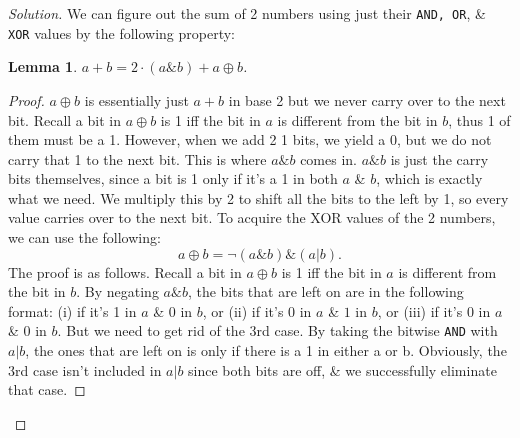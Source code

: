 \documentclass{article}
\newtheorem{lemma}{Lemma}
\begin{document}
\begin{proof}[Solution]
    We can figure out the sum of 2 numbers using just their {\tt AND, OR}, \& {\tt XOR} values by the following property:

    \begin{lemma}
        $a + b = 2\cdot(a\&b) + a\oplus b$.
    \end{lemma}

    \begin{proof}[Proof]
        $a\oplus b$ is essentially just $a + b$ in base 2 but we never carry over to the next bit. Recall a bit in $a\oplus b$ is 1 iff the bit in $a$ is different from the bit in $b$, thus 1 of them must be a 1. However, when we add 2 1 bits, we yield a 0, but we do not carry that 1 to the next bit. This is where $a\&b$ comes in. $a\&b$ is just the carry bits themselves, since a bit is 1 only if it's a 1 in both $a$ \& $b$, which is exactly what we need. We multiply this by 2 to shift all the bits to the left by 1, so every value carries over to the next bit. To acquire the XOR values of the 2 numbers, we can use the following:
        \begin{equation*}
            a\oplus b = \neg(a\&b)\&(a|b).
        \end{equation*}
        The proof is as follows. Recall a bit in $a\oplus b$ is 1 iff the bit in $a$ is different from the bit in $b$. By negating $a\&b$, the bits that are left on are in the following format: (i) if it's 1 in $a$ \& 0 in $b$, or (ii) if it's 0 in $a$ \& $1$ in $b$, or (iii) if it's 0 in $a$ \& 0 in $b$. But we need to get rid of the 3rd case. By taking the bitwise {\tt AND} with $a|b$, the ones that are left on is only if there is a 1 in either a or b. Obviously, the 3rd case isn't included in $a|b$ since both bits are off, \& we successfully eliminate that case.


\end{proof}
\end{proof}
\end{document}
